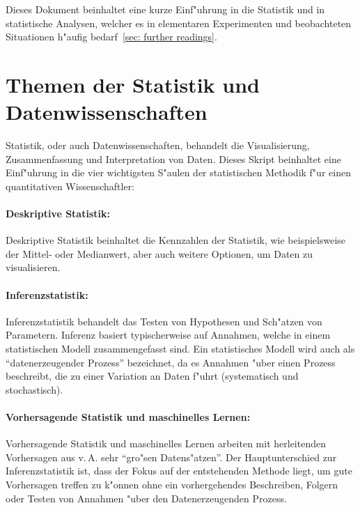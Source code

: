 \documentclass[a4paper,twoside]{tufte-book}\usepackage[]{graphicx}\usepackage[]{color}
\begin{document}
	Dieses Dokument beinhaltet eine kurze Einf"uhrung in die Statistik und in statistische Analysen, welcher es in elementaren Experimenten und beobachteten Situationen h"aufig bedarf~\ref{sec: further readings}.
	
	\section{Themen der Statistik und Datenwissenschaften}
	Statistik, oder auch Datenwissenschaften, behandelt die Visualisierung, Zusammenfassung und Interpretation von Daten. Dieses Skript beinhaltet eine Einf"uhrung in die vier wichtigsten S"aulen der statistischen Methodik f"ur einen quantitativen Wissenschaftler:
	
	\paragraph{Deskriptive Statistik:} Deskriptive Statistik beinhaltet die Kennzahlen der Statistik, wie beispielsweise der Mittel- oder Medianwert, aber auch weitere Optionen, um Daten zu visualisieren.
	
	\paragraph{Inferenzstatistik:} Inferenzstatistik behandelt das Testen von Hypothesen und Sch"atzen von Parametern. Inferenz basiert typischerweise auf Annahmen, welche in einem statistischen Modell zusammengefasst sind. Ein statistisches Modell wird auch als "`datenerzeugender Prozess"' bezeichnet, da es Annahmen "uber einen Prozess beschreibt, die zu einer Variation an Daten f"uhrt (systematisch und stochastisch).
	
	\paragraph{Vorhersagende Statistik und maschinelles Lernen:} Vorhersagende Statistik und maschinelles Lernen arbeiten mit herleitenden Vorhersagen aus v.\,A. sehr "`gro"sen Datens"atzen"'. Der Hauptunterschied zur Inferenzstatistik ist, dass der Fokus auf der entstehenden Methode liegt, um gute Vorhersagen treffen zu k"onnen ohne ein vorhergehendes Beschreiben, Folgern oder Testen von Annahmen "uber den Datenerzeugenden Prozess.
	
\end{document}

